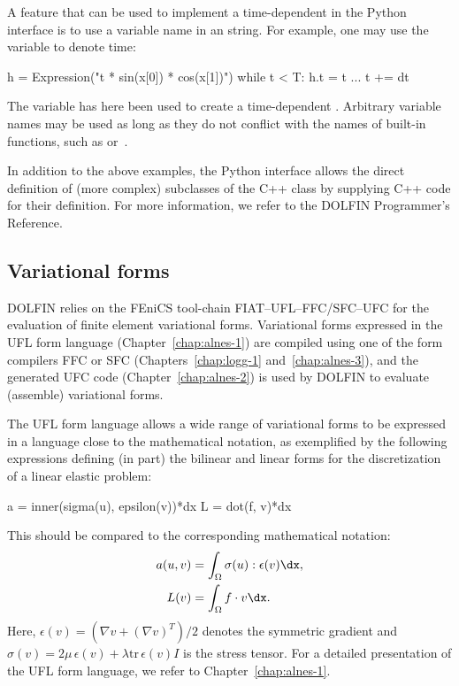 A feature that can be used to implement a time-dependent 
in the Python interface is to use a variable name in an 
string.  For example, one may use the variable  to denote time:
\begin{python}
h = Expression("t * sin(x[0]) * cos(x[1])")
while t < T:
    h.t = t
    ...
    t += dt
\end{python}
The  variable has here been used to create a time-dependent
. Arbitrary variable names may be used as long as they
do not conflict with the names of built-in functions, such as 
or~.


In addition to the above examples, the Python interface allows
the direct definition of (more complex) subclasses of the C++
 class by supplying C++ code for their definition. For
more information, we refer to the DOLFIN Programmer's Reference.

\subsection{Variational forms}

DOLFIN relies on the FEniCS tool-chain FIAT--UFL--FFC/SFC--UFC for the
evaluation of finite element variational forms. Variational forms
expressed in the UFL form language (Chapter~\ref{chap:alnes-1})
are compiled using one of the form compilers FFC or SFC
(Chapters~\ref{chap:logg-1} and~\ref{chap:alnes-3}), and the generated
UFC code (Chapter~\ref{chap:alnes-2}) is used by DOLFIN to
evaluate (assemble) variational forms.

The UFL form language allows a wide range of variational forms to be
expressed in a language close to the mathematical notation, as exemplified
by the following expressions defining (in part) the bilinear and linear
forms for the discretization of a linear elastic problem:
\begin{uflcode}
a = inner(sigma(u), epsilon(v))*dx
L = dot(f, v)*dx
\end{uflcode}
This should be compared to the corresponding mathematical notation:
\begin{align} \label{eq:logg-2:elasticity1}
  a(u, v) &= \int_{\Omega} \sigma(u) : \epsilon(v) \dx,
\\
  L(v)    &= \int_{\Omega} f \cdot v \dx.
\end{align}
Here, $\epsilon(v) = (\nabla v + (\nabla v)^{T}) / 2$ denotes the
symmetric gradient and $\sigma(v) = 2 \mu \, \epsilon(v) + \lambda
\mathrm{tr} \, \epsilon(v) I$ is the stress tensor. For a detailed
presentation of the UFL form language, we refer to
Chapter~\ref{chap:alnes-1}.


